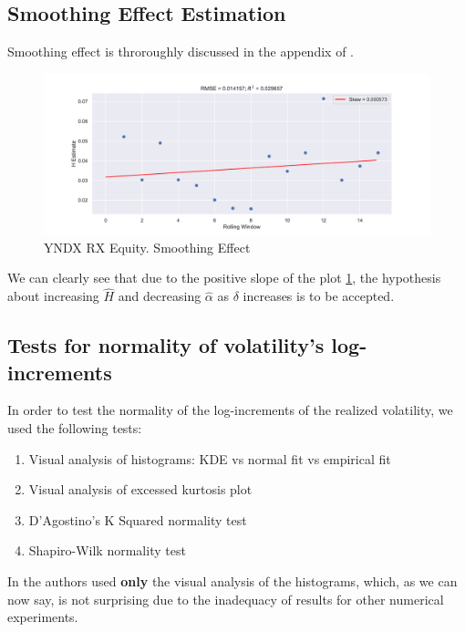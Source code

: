        

    \subsection{Smoothing Effect Estimation}
        Smoothing effect is throroughly discussed in the appendix of \cite{GatheralRosenbaum2014}.

        \begin{figure}[htbp]
            \includegraphics[width=\textwidth]{fig/YNDX RX Equity Smoothing Effect.pdf}
            \caption{YNDX RX Equity. Smoothing Effect}
            \label{fig:smooth}
        \end{figure}

        We can clearly see that due to the positive slope of the plot \ref{fig:smooth}, the hypothesis about increasing $\hat{H}$ and decreasing $\hat{\alpha}$ as $\delta$ increases is to be accepted.

    \subsection{Tests for normality of volatility's log-increments}
        In order to test the normality of the log-increments of the realized volatility, we used the following tests:
        \begin{enumerate}
            \item Visual analysis of histograms: KDE vs normal fit vs empirical fit
            \item Visual analysis of excessed kurtosis plot
            \item D'Agostino's K Squared normality test
            \item Shapiro-Wilk normality test
        \end{enumerate}

        In \cite{GatheralRosenbaum2014} the authors used \textbf{only} the visual analysis of the 
        histograms, which, as we can now say, is not surprising due to the inadequacy of results 
        for other numerical experiments.

